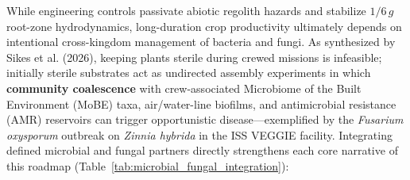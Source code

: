 While engineering controls passivate abiotic regolith hazards and stabilize $1/6\,g$ root-zone hydrodynamics, long-duration crop productivity ultimately depends on intentional cross-kingdom management of bacteria and fungi\cite{sikes2026charting}. As synthesized by Sikes et al. (2026), keeping plants sterile during crewed missions is infeasible; initially sterile substrates act as undirected assembly experiments in which \textbf{community coalescence} with crew-associated Microbiome of the Built Environment (MoBE) taxa, air/water-line biofilms, and antimicrobial resistance (AMR) reservoirs can trigger opportunistic disease---exemplified by the \textit{Fusarium oxysporum} outbreak on \textit{Zinnia hybrida} in the ISS VEGGIE facility\cite{sikes2026charting,schuerger2021fusarium,baxter2026biofilms}. Integrating defined microbial and fungal partners directly strengthens each core narrative of this roadmap (Table~\ref{tab:microbial_fungal_integration}):
